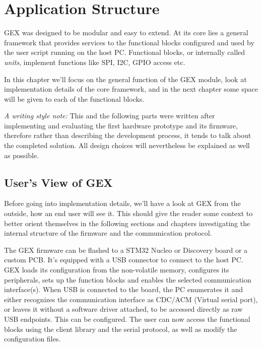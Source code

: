 \chapter{Application Structure}

GEX was designed to be modular and easy to extend. At its core lies a general framework that provides services to the functional blocks configured and used by the user script running on the host PC. Functional blocks, or internally called \textit{units}, implement functions like SPI, I2C, GPIO access etc. 

In this chapter we'll focus on the general function of the GEX module, look at implementation details of the core framework, and in the next chapter some space will be given to each of the functional blocks.

\textit{A writing style note:} This and the following parts were written after implementing and evaluating the first hardware prototype and its firmware, therefore rather than describing the development process, it tends to talk about the completed solution. All design choices will nevertheless be explained as well as possible.

\section{User's View of GEX}

Before going into implementation details, we'll have a look at GEX from the outside, how an end user will see it. This should give the reader some context to better orient themselves in the following sections and chapters investigating the internal structure of the firmware and the communication protocol.

The GEX firmware can be flashed to a STM32 Nucleo or Discovery board or a custom PCB. It's equipped with a USB connector to connect to the host PC.  GEX loads its configuration from the non-volatile memory, configures its peripherals, sets up the function blocks and enables the selected communication interface(s). When USB is connected to the board, the PC enumerates it and either recognizes the communication interface as CDC/ACM (Virtual serial port), or leaves it without a software driver attached, to be accessed directly as raw USB endpoints. This can be configured. The user can now access the functional blocks using the client library and the serial protocol, as well as modify the configuration files.

